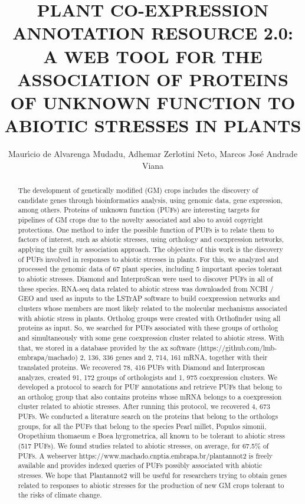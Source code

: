 \documentclass[twoside]{article}
\title{\vspace{-15mm}\fontsize{24pt}{10pt}\selectfont\textbf{ PLANT CO-EXPRESSION ANNOTATION RESOURCE 2.0: A WEB TOOL FOR THE ASSOCIATION OF PROTEINS OF UNKNOWN FUNCTION TO ABIOTIC STRESSES IN PLANTS }} %
\author{ Maur\'{\i}cio de Alvarenga Mudadu,  Adhemar Zerlotini Neto,  Marcos Jos\'e Andrade Viana }
\affil{ UNIVERSIDADE FEDERAL DE MINAS GERAIS }
\date{}
\begin{document}
  
  
  \maketitle %
  
  
  \thispagestyle{fancy} %
  
  
  \begin{abstract}
  The development of genetically modified (GM) crops includes the discovery of candidate genes through bioinformatics analysis,  using genomic data,  gene expression,  among others. Proteins of unknown function (PUFs) are interesting targets for pipelines of GM crops due to the novelty associated and also to avoid copyright protections. One method to infer the possible function of PUFs is to relate them to factors of interest,  such as abiotic stresses,  using orthology and coexpression networks,  applying the guilt by association approach. The objective of this work is the discovery of PUFs involved in responses to abiotic stresses in plants. For this,  we analyzed  and processed the genomic data of 67 plant species,  including 5 important species tolerant to abiotic stresses. Diamond and InterproScan were used to discover PUFs in all of these species. RNA-seq data related to abiotic stress was downloaded from NCBI / GEO and used as inputs to the LSTrAP software to build coexpression networks and clusters whose members are most likely related to the molecular mechanisms associated with abiotic stress in plants. Ortholog groups were created with Orthofinder using all proteins as input. So,  we searched for PUFs associated with these groups of ortholog and simultaneously with some gene coexpression cluster related to abiotic stress. With that,  we stored in a database provided by the ax software (https://github.com/lmb-embrapa/machado) 2, 136, 336 genes and 2, 714, 161 mRNA,  together with their translated proteins. We recovered 78, 416 PUFs with Diamond and Interproscan analyzes,  created 91, 172 groups of orthologists and 1, 975 coexpression clusters. We developed a protocol to search for PUF annotations and retrieve PUFs that belong to an ortholog group that also contains proteins whose mRNA belongs to a coexpression cluster related to abiotic stresses. After running this protocol,  we recovered 4, 673 PUFs. We conducted a literature search on the proteins that belong to the orthologs groups,  for all the PUFs that belong to the species Pearl millet,  Populos simonii,  Oropethium thomaeum e Boea hygrometrica,  all known to be tolerant to abiotic stress (517 PUFs). We found studies related to abiotic stresses,  on average,  for 67.5\% of PUFs. A webserver https://www.machado.cnptia.embrapa.br/plantannot2 is freely available and provides indexed queries of PUFs possibly associated with abiotic stresses. We hope that Plantannot2 will be useful for researchers trying to obtain genes related to responses to abiotic stresses for the production of new GM crops tolerant to the risks of climate change.
  

\end{abstract}
\end{document}
